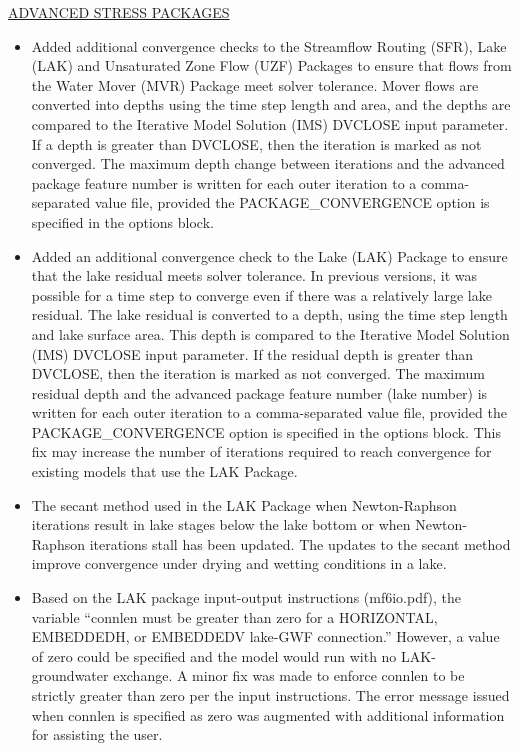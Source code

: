 	\underline{ADVANCED STRESS PACKAGES}
	\begin{itemize}
		\item Added additional convergence checks to the Streamflow Routing (SFR), Lake (LAK) and Unsaturated Zone Flow (UZF) Packages to ensure that flows from the Water Mover (MVR) Package meet solver tolerance.  Mover flows are converted into depths using the time step length and area, and the depths are compared to the Iterative Model Solution (IMS) DVCLOSE input parameter.  If a depth is greater than DVCLOSE, then the iteration is marked as not converged.  The maximum depth change between iterations and the advanced package feature number is written for each outer iteration to a comma-separated value file, provided the PACKAGE\_CONVERGENCE option is specified in the options block.
		\item Added an additional convergence check to the Lake (LAK) Package to ensure that the lake residual meets solver tolerance.  In previous versions, it was possible for a time step to converge even if there was a relatively large lake residual. The lake residual is converted to a depth, using the time step length and lake surface area. This depth is compared to the Iterative Model Solution (IMS) DVCLOSE input parameter. If the residual depth is greater than DVCLOSE, then the iteration is marked as not converged. The maximum residual depth and the advanced package feature number (lake number) is written for each outer iteration to a comma-separated value file, provided the PACKAGE\_CONVERGENCE option is specified in the options block. This fix may increase the number of iterations required to reach convergence for existing models that use the LAK Package.
		\item The secant method used in the LAK Package when Newton-Raphson iterations result in lake stages below the lake bottom or when Newton-Raphson iterations stall has been updated. The updates to the secant method improve convergence under drying and wetting conditions in a lake. 		
		\item Based on the LAK package input-output instructions (mf6io.pdf), the variable ``connlen must be greater than zero for a HORIZONTAL, EMBEDDEDH, or EMBEDDEDV lake-GWF connection.'' However, a value of zero could be specified and the model would run with no LAK-groundwater exchange. A minor fix was made to enforce connlen to be strictly greater than zero per the input instructions.  The error message issued when connlen is specified as zero was augmented with additional information for assisting the user.

\end{itemize}
